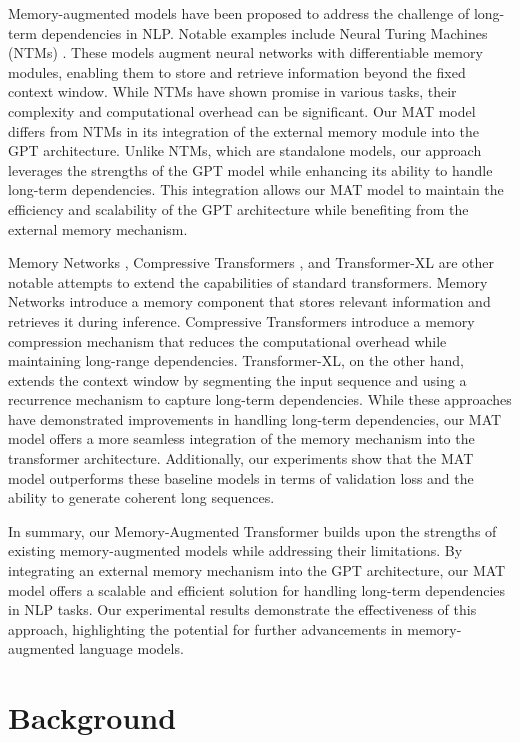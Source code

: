 \documentclass{article} %
\begin{document}
Memory-augmented models have been proposed to address the challenge of long-term dependencies in NLP. Notable examples include Neural Turing Machines (NTMs) \citep{Graves2014NeuralTM}. These models augment neural networks with differentiable memory modules, enabling them to store and retrieve information beyond the fixed context window. While NTMs have shown promise in various tasks, their complexity and computational overhead can be significant. Our MAT model differs from NTMs in its integration of the external memory module into the GPT architecture. Unlike NTMs, which are standalone models, our approach leverages the strengths of the GPT model while enhancing its ability to handle long-term dependencies. This integration allows our MAT model to maintain the efficiency and scalability of the GPT architecture while benefiting from the external memory mechanism.

Memory Networks \citep{Henaff2016TrackingTW}, Compressive Transformers \citep{Rae2019CompressiveTF}, and Transformer-XL \citep{Dai2019TransformerXLAL} are other notable attempts to extend the capabilities of standard transformers. Memory Networks introduce a memory component that stores relevant information and retrieves it during inference. Compressive Transformers introduce a memory compression mechanism that reduces the computational overhead while maintaining long-range dependencies. Transformer-XL, on the other hand, extends the context window by segmenting the input sequence and using a recurrence mechanism to capture long-term dependencies. While these approaches have demonstrated improvements in handling long-term dependencies, our MAT model offers a more seamless integration of the memory mechanism into the transformer architecture. Additionally, our experiments show that the MAT model outperforms these baseline models in terms of validation loss and the ability to generate coherent long sequences.

In summary, our Memory-Augmented Transformer builds upon the strengths of existing memory-augmented models while addressing their limitations. By integrating an external memory mechanism into the GPT architecture, our MAT model offers a scalable and efficient solution for handling long-term dependencies in NLP tasks. Our experimental results demonstrate the effectiveness of this approach, highlighting the potential for further advancements in memory-augmented language models.

\section{Background}
\label{sec:background}
\end{document}

